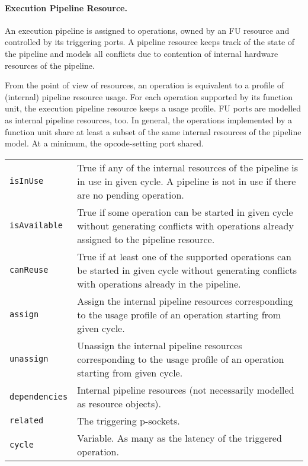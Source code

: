 \documentclass[a4paper,twoside]{tce}
\begin{document}
\paragraph{Execution Pipeline Resource.}

An execution pipeline is assigned to operations, owned by an FU resource and
controlled by its triggering ports. A pipeline resource keeps track of the
state of the pipeline and models all conflicts due to contention of internal
hardware resources of the pipeline.

From the point of view of resources, an operation is equivalent to a profile
of (internal) pipeline resource usage. For each operation supported by its
function unit, the execution pipeline resource keeps a usage profile.
%
FU ports are modelled as internal pipeline resources, too.
%
In general, the operations implemented by a function unit share at least a
subset of the same internal resources of the pipeline model. At a minimum,
the opcode-setting port shared.

\begin{flushleft}
\begin{tabular*}{\textwidth}[h]{|l|@{\extracolsep{\fill}}p{}|}
  \hline
  \texttt{isInUse} &
  True if any of the internal resources of the pipeline is in use in given
  cycle. A pipeline is not in use if there are no pending operation.\\
  \texttt{isAvailable} &
  True if some operation can be started in given cycle without generating
  conflicts with operations already assigned to the pipeline
  resource.\footnotemark\\
  \texttt{canReuse} &
  True if at least one of the supported operations can be started in given
  cycle without generating conflicts with operations already in the
  pipeline.\\
  \texttt{assign} &
  Assign the internal pipeline resources corresponding to the usage profile
  of an operation starting from given cycle.\\
  \texttt{unassign} &
  Unassign the internal pipeline resources corresponding to the usage
  profile of an operation starting from given cycle.\\
  \texttt{dependencies} &
  Internal pipeline resources (not necessarily modelled as resource
  objects).\\
  \texttt{related} &
  The triggering p-sockets. \\
  \texttt{cycle} &
  Variable. As many as the latency of the triggered operation.\\
  \hline
\end{tabular*}
\end{flushleft}
%
\end{document}

